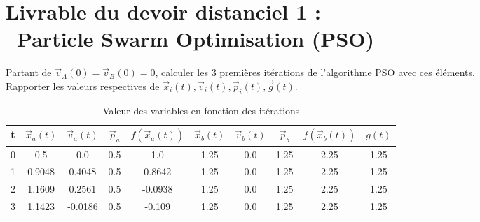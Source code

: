 
\section*{Livrable du devoir distanciel 1 : \\ Particle Swarm Optimisation (PSO)
}

%
%

\vspace{5mm}
\noindent
{}
\vspace{2mm}

\noindent
Partant de $\vec{v}_A(0) = \vec{v}_B(0) = 0$, calculer les 3 premières itérations de l’algorithme PSO avec ces
éléments. \\Rapporter les valeurs respectives de $\vec{x}_i(t),  \vec{v}_i(t),  \vec{p}_i(t),  \vec{g}(t)$. 

\begin{table}[h ]
    \centering
    \begin{tabular}{|c|c|c|c|c|c|c|c|c|c|}
        \toprule
        t  & $\vec{x}_a(t)$ & $\vec{v}_a(t)$ & $\vec{p}_a$ & $f(\vec{x}_a(t))$& $\vec{x}_b(t)$ & $\vec{v}_b(t)$ & $\vec{p}_b$ & $f(\vec{x}_b(t))$ & $g(t)$\\
        \midrule
        0 & 0.5 & 0.0 & 0.5 & 1.0 & 1.25 & 0.0 & 1.25 & 2.25 & 1.25\\
        1 & 0.9048 & 0.4048 & 0.5 & 0.8642 & 1.25 & 0.0 & 1.25 & 2.25 & 1.25 \\
        2 & 1.1609 & 0.2561 & 0.5 & -0.0938 & 1.25 & 0.0 & 1.25 & 2.25 & 1.25\\
        3 & 1.1423 & -0.0186 & 0.5 & -0.109 & 1.25 & 0.0 & 1.25 & 2.25 & 1.25\\
        \bottomrule
    \end{tabular}
    \caption{Valeur des variables en fonction des itérations}
    \label{tab:my_label}
\end{table}


